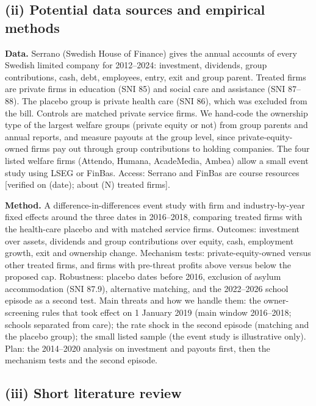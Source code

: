 \documentclass[12pt,a4paper]{article}
\begin{document}
\subsection{(ii) Potential data sources and empirical methods}

\textbf{Data.} Serrano (Swedish House of Finance) gives the annual accounts of every Swedish limited company for 2012--2024: investment, dividends, group contributions, cash, debt, employees, entry, exit and group parent. Treated firms are private firms in education (SNI 85) and social care and assistance (SNI 87--88). The placebo group is private health care (SNI 86), which was excluded from the bill. Controls are matched private service firms. We hand-code the ownership type of the largest welfare groups (private equity or not) from group parents and annual reports, and measure payouts at the group level, since private-equity-owned firms pay out through group contributions to holding companies. The four listed welfare firms (Attendo, Humana, AcadeMedia, Ambea) allow a small event study using LSEG or FinBas. Access: Serrano and FinBas are course resources [verified on (date); about (N) treated firms].

\textbf{Method.} A difference-in-differences event study with firm and industry-by-year fixed effects around the three dates in 2016--2018, comparing treated firms with the health-care placebo and with matched service firms. Outcomes: investment over assets, dividends and group contributions over equity, cash, employment growth, exit and ownership change. Mechanism tests: private-equity-owned versus other treated firms, and firms with pre-threat profits above versus below the proposed cap. Robustness: placebo dates before 2016, exclusion of asylum accommodation (SNI 87.9), alternative matching, and the 2022--2026 school episode as a second test. Main threats and how we handle them: the owner-screening rules that took effect on 1 January 2019 (main window 2016--2018; schools separated from care); the rate shock in the second episode (matching and the placebo group); the small listed sample (the event study is illustrative only). Plan: the 2014--2020 analysis on investment and payouts first, then the mechanism tests and the second episode.

\subsection{(iii) Short literature review}
\end{document}
